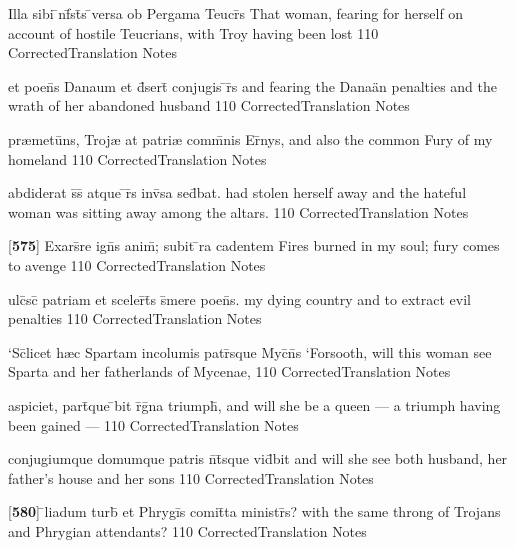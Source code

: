 \latline
  {Illa sibi \={\macron {\i}}nf\={}st\={}s \={}versa ob Pergama Teucr\={}s}
  { That woman, fearing for herself on account of hostile Teucrians, with Troy having been lost  }
  {110}
  { CorrectedTranslation }
  { Notes }


\latline
  {et poen\={}s Danaum et d\={}sert\={\macron {\i}} conjugis \={\macron {\i}}r\={}s}
  { and fearing the Dana\"an penalties and the wrath of her abandoned husband }
  {110}
  { CorrectedTranslation }
  { Notes }


\latline
  {pr{\ae}metu\={}ns, Troj{\ae} at patri{\ae} comm\={}nis Er\={\macron {\i}}nys,}
  { and also the common Fury of my homeland }
  {110}
  { CorrectedTranslation }
  { Notes }


\latline
  {abdiderat s\={}s\={} atque \={}r\={\macron {\i}}s inv\={\macron {\i}}sa sed\={}bat.}
  { had stolen herself away and the hateful woman was sitting away among the altars.  }
  {110}
  { CorrectedTranslation }
  { Notes }


\latline
  {[\textbf{575}] Exars\={}re ign\={}s anim\={}; subit \={\macron {\i}}ra cadentem}
  { Fires burned in my soul; fury comes to avenge }
  {110}
  { CorrectedTranslation }
  { Notes }


\latline
  {ulc\={\macron {\i}}sc\={\macron {\i}} patriam et sceler\={}t\={}s s\={}mere poen\={}s.}
  { my dying country and to extract evil penalties }
  {110}
  { CorrectedTranslation }
  { Notes }


\latline
  {`Sc\={\macron {\i}}licet h{\ae}c Spartam incolumis patr\={}sque Myc\={}n\={}s}
  { `Forsooth, will this woman see Sparta and her fatherlands of Mycenae, }
  {110}
  { CorrectedTranslation }
  { Notes }


\latline
  {aspiciet, part\={}que \={\macron {\i}}bit r\={}g\={\macron {\i}}na triumph\={},}
  { and will she be a queen --- a triumph having been gained --- }
  {110}
  { CorrectedTranslation }
  { Notes }


\latline
  {conjugiumque domumque patris n\={}t\={}sque vid\={}bit}
  { and will she see both husband, her father's house and her sons }
  {110}
  { CorrectedTranslation }
  { Notes }


\latline
  {[\textbf{580}] \={}liadum turb\={} et Phrygi\={\macron {\i}}s comit\={}ta ministr\={\macron {\i}}s?}
  { with the same throng of Trojans and Phrygian attendants? }
  {110}
  { CorrectedTranslation }
  { Notes }


